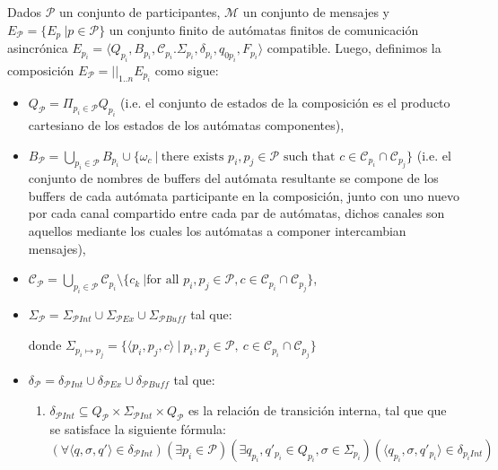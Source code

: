 \begin{definition}[Composición]
\label{def:composicion}
Dados $\mathcal{P}$ un conjunto de participantes, $\mathcal{M}$ un conjunto de mensajes y $E_\mathcal{P} = \{E_{p} \ | p \in \mathcal{P}\}$ un conjunto finito de autómatas finitos de comunicación asincrónica $E_{p_i}= \langle Q_{p_i}, B_{p_i}, \mathcal{C}_{p_i}. \Sigma_{p_i}, \delta_{p_i}, q_{0{p_i}}, F_{p_i} \rangle$ compatible. Luego, definimos la composición $E_\mathcal{P} = ||_{1..n} E_{p_i}$ como sigue:
\begin{itemize}
    \item $Q_\mathcal{P}= \Pi_{p_i \in \mathcal{P}} Q_{p_i}$ (i.e. el conjunto de estados de la composición es el producto cartesiano de los estados de los autómatas componentes),    
    \item $B_\mathcal{P} = \bigcup_{p_i \in \mathcal{P}} B_{p_i} \cup \{ \omega_c \ | \ \mbox{there exists } p_i, p_j \in \mathcal{P} \mbox{ such that } c \in \mathcal{C}_{p_i} \cap \mathcal{C}_{p_j} \}$ (i.e. el conjunto de nombres de buffers del autómata resultante se compone de los buffers de cada autómata participante en la composición, junto con uno nuevo por cada canal compartido entre cada par de autómatas, dichos canales son aquellos mediante los cuales los autómatas a componer intercambian mensajes),    
    \item $\mathcal{C}_\mathcal{P} = \bigcup_{p_i \in \mathcal{P}} \mathcal{C}_{p_i} \setminus \{ c_k \ | \mbox{for all } p_i, p_j \in \mathcal{P}, c \in \mathcal{C}_{p_i} \cap \mathcal{C}_{p_j} \}$,    
    \item $\Sigma_\mathcal{P} = \Sigma_{\mathcal{P}\mathit{Int}} \cup  \Sigma_{\mathcal{P}\mathit{Ex}} \cup \Sigma_{\mathcal{P}\mathit{Buff}}$ tal que:    
donde $\Sigma_\mathit{p_i \mapsto p_j} =\{ \langle p_i,p_j,c \rangle \ | \ p_i, p_j \in \mathcal{P}, \  c \in \mathcal{C}_{p_i} \cap \mathcal{C}_{p_j}\}$
\item $\delta_{\mathcal{P}} = \delta_{\mathcal{P}\mathit{Int}} \cup \delta_{\mathcal{P}\mathit{Ex}} \cup \delta_{\mathcal{P}\mathit{Buff}}$ tal que:
\begin{enumerate}
\item $\delta_{\mathcal{P}\mathit{Int}} \subseteq Q_{\mathcal{P}} \times \Sigma_{\mathcal{P} Int} \times Q_{\mathcal{P}}$  es la relación de transición interna, tal que que se satisface la siguiente fórmula:
$$(\forall \langle q, \sigma, q' \rangle \in \delta_{\mathcal{P}\mathit{Int}})(\exists p_i \in \mathcal{P})(\exists q_{p_i}, q'_{p_i} \in Q_{p_i}, \sigma \in \Sigma_{p_i})(\langle q_{p_i}, \sigma, q'_{p_i} \rangle \in \delta_{p_i Int})$$


\end{enumerate}
\end{itemize}
\end{definition}
